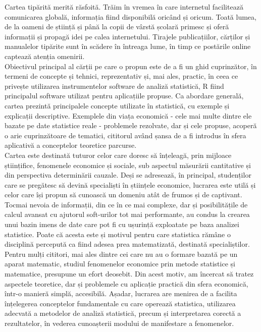 \documentclass[
  11pt,
  b5paper,
  nottoc]{book}
\begin{document}
Cartea tipărită merită răsfoită. Trăim în vremea în care internetul
facilitează comunicarea globală, informația fiind disponibilă oricând și
oricum. Toată lumea, de la oameni de știință și până la copii de vârstă
școlară primesc și oferă informații și propagă idei pe calea
internetului. Tirajele publicațiilor, cărților și manualelor tipărite
sunt în scădere în întreaga lume, în timp ce postările online captează
atenția omenirii.\\
Obiectivul principal al cărții pe care o propun este de a fi un ghid
cuprinzător, în termeni de concepte și tehnici, reprezentativ și, mai
ales, practic, în ceea ce privește utilizarea instrumentelor software de
analiză statistică, R fiind principalul software utilizat pentru
aplicațiile propuse. Ca abordare generală, cartea prezintă principalele
concepte utilizate în statistică, cu exemple și explicații descriptive.
Exemplele din viața economică - cele mai multe dintre ele bazate pe date
statistice reale - problemele rezolvate, dar și cele propuse, acoperă o
arie cuprinzătoare de tematici, cititorul având șansa de a fi introdus
în sfera aplicativă a conceptelor teoretice parcurse.\\
Cartea este destinată tuturor celor care doresc să înțeleagă, prin
mijloace științifice, fenomenele economice și sociale, sub aspectul
măsurării cantitative și din perspectiva determinării cauzale. Deși se
adresează, în principal, studenților care se pregătesc să devină
specialiști în științele economice, lucrarea este utilă și celor care
își propun să cunoască un domeniu atât de frumos și de captivant. Tocmai
nevoia de informații, din ce în ce mai complexe, dar și posibilitățile
de calcul avansat cu ajutorul soft-urilor tot mai performante, au condus
la crearea unui bazin imens de date care pot fi cu ușurință exploatate
pe baza analizei statistice. Poate că acesta este și motivul pentru care
statistica rămâne o disciplină percepută ca fiind adesea prea
matematizată, destinată specialiștilor. Pentru mulți cititori, mai ales
dintre cei care nu au o formare bazată pe un aparat matematic, studiul
fenomenelor economice prin metode statistice și matematice, presupune un
efort deosebit. Din acest motiv, am încercat să tratez aspectele
teoretice, dar și problemele cu aplicație practică din sfera economică,
într-o manieră simplă, accesibilă. Așadar, lucrarea are menirea de a
facilita înțelegerea conceptelor fundamentale cu care operează
statistica, utilizarea adecvată a metodelor de analiză statistică,
precum și interpretarea corectă a rezultatelor, în vederea cunoașterii
modului de manifestare a fenomenelor.
\end{document}
